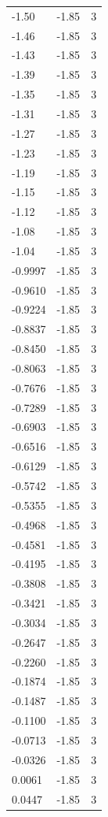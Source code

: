 \begin{longtable}{lrr}
  -1.50 & -1.85 & 3 \\
  -1.46 & -1.85 & 3 \\
  -1.43 & -1.85 & 3 \\
  -1.39 & -1.85 & 3 \\
  -1.35 & -1.85 & 3 \\
  -1.31 & -1.85 & 3 \\
  -1.27 & -1.85 & 3 \\
  -1.23 & -1.85 & 3 \\
  -1.19 & -1.85 & 3 \\
  -1.15 & -1.85 & 3 \\
  -1.12 & -1.85 & 3 \\
  -1.08 & -1.85 & 3 \\
  -1.04 & -1.85 & 3 \\
  -0.9997 & -1.85 & 3 \\
  -0.9610 & -1.85 & 3 \\
  -0.9224 & -1.85 & 3 \\
  -0.8837 & -1.85 & 3 \\
  -0.8450 & -1.85 & 3 \\
  -0.8063 & -1.85 & 3 \\
  -0.7676 & -1.85 & 3 \\
  -0.7289 & -1.85 & 3 \\
  -0.6903 & -1.85 & 3 \\
  -0.6516 & -1.85 & 3 \\
  -0.6129 & -1.85 & 3 \\
  -0.5742 & -1.85 & 3 \\
  -0.5355 & -1.85 & 3 \\
  -0.4968 & -1.85 & 3 \\
  -0.4581 & -1.85 & 3 \\
  -0.4195 & -1.85 & 3 \\
  -0.3808 & -1.85 & 3 \\
  -0.3421 & -1.85 & 3 \\
  -0.3034 & -1.85 & 3 \\
  -0.2647 & -1.85 & 3 \\
  -0.2260 & -1.85 & 3 \\
  -0.1874 & -1.85 & 3 \\
  -0.1487 & -1.85 & 3 \\
  -0.1100 & -1.85 & 3 \\
  -0.0713 & -1.85 & 3 \\
  -0.0326 & -1.85 & 3 \\
  0.0061 & -1.85 & 3 \\
  0.0447 & -1.85 & 3 \\

\end{longtable}
